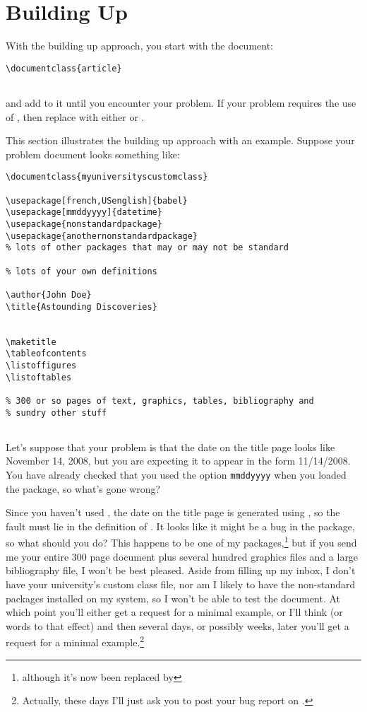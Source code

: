 \section{Building Up}
\label{sec:buildingup}

With the building up approach, you start with the document:
\begin{verbatim}
\documentclass{article}


\end{verbatim}
and add to it until you encounter your problem. If your problem
requires the use of , then replace  with
either  or . 

This section illustrates the building up approach with an example.
Suppose your problem document looks something like:
\begin{verbatim}
\documentclass{myuniversityscustomclass}

\usepackage[french,USenglish]{babel}
\usepackage[mmddyyyy]{datetime}
\usepackage{nonstandardpackage}
\usepackage{anothernonstandardpackage}
% lots of other packages that may or may not be standard

% lots of your own definitions

\author{John Doe}
\title{Astounding Discoveries}


\maketitle
\tableofcontents
\listoffigures
\listoftables

% 300 or so pages of text, graphics, tables, bibliography and
% sundry other stuff


\end{verbatim}

Let's suppose that your problem is that the date on the title page
looks like November 14, 2008, but you are expecting it to appear in
the form 11/14/2008. You have already checked that you used the
option \texttt{mmddyyyy} when you loaded the  package,
so what's gone wrong? 

Since you haven't used , the date on the title page is
generated using , so the fault must lie in the definition of
. It looks like it might be a bug in the  package, so
what should you do? This happens to be one of my
packages,\footnote{although it's now been replaced by } but if
you send me your entire 300 page document plus several hundred
graphics files and a large bibliography file, I won't be best
pleased. Aside from filling up my inbox, I don't have your
university's custom class file, nor am I likely to have the 
non-standard packages installed on my system, so I won't be able to test
the document. At which point you'll either get a request for a
minimal example, or I'll think  (or words to that effect) and then several days, or
possibly weeks, later you'll get a request for a minimal
example.\footnote{Actually, these days I'll just ask you to post
your bug report on .} 

